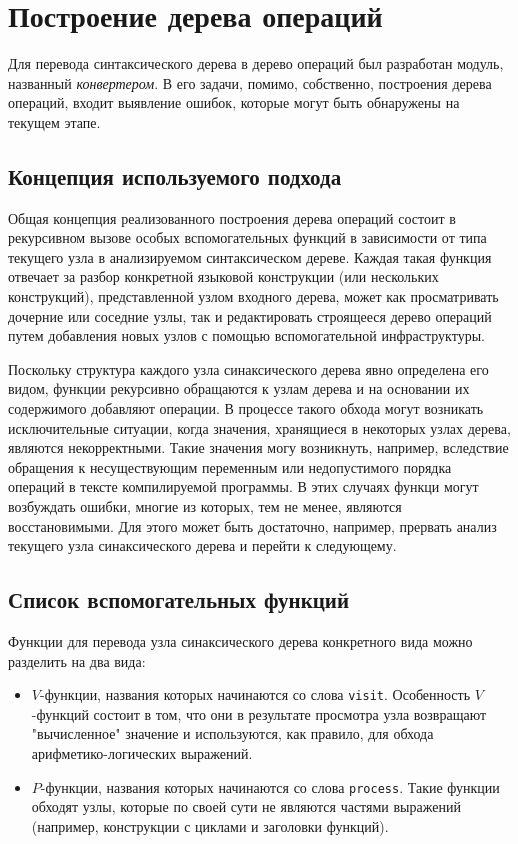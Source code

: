 \newpage
\section{Построение дерева операций}
\label{sec:converter}

Для перевода синтаксического дерева в дерево операций был разработан модуль, названный \textit{конвертером}.
В его задачи, помимо, собственно, построения дерева операций, входит выявление ошибок, которые могут быть обнаружены на текущем этапе.

\subsection{Концепция используемого подхода}
\label{sec:converter_concept}

Общая концепция реализованного построения дерева операций состоит в рекурсивном вызове особых вспомогательных функций в зависимости от типа текущего узла в анализируемом синтаксическом дереве.
Каждая такая функция отвечает за разбор конкретной языковой конструкции (или нескольких конструкций), представленной узлом входного дерева, может как просматривать дочерние или соседние узлы, так и редактировать строящееся дерево операций путем добавления новых узлов с помощью вспомогательной инфраструктуры.

Поскольку структура каждого узла синаксического дерева явно определена его видом, функции рекурсивно обращаются к узлам дерева и на основании их содержимого добавляют операции.
В процессе такого обхода могут возникать исключительные ситуации, когда значения, хранящиеся в некоторых узлах дерева, являются некорректными.
Такие значения могу возникнуть, например, вследствие обращения к несуществующим переменным или недопустимого порядка операций в тексте компилируемой программы.
В этих случаях функци могут возбуждать ошибки, многие из которых, тем не менее, являются восстановимыми.
Для этого может быть достаточно, например, прервать анализ текущего узла синаксического дерева и перейти к следующему.

\subsection{Список вспомогательных функций}
\label{sec:converter_functions}

Функции для перевода узла синаксического дерева конкретного вида можно разделить на два вида:

\begin{itemize}
    \item \(V\)-функции, названия которых начинаются со слова \verb|visit|.
          Особенность \(V\)-функций состоит в том, что они в результате просмотра узла возвращают "вычисленное" значение и используются, как правило, для обхода арифметико-логических выражений.
    \item \(P\)-функции, названия которых начинаются со слова \verb|process|.
          Такие функции обходят узлы, которые по своей сути не являются частями выражений (например, конструкции с циклами и заголовки функций).
\end{itemize}

